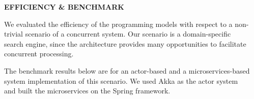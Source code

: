 \documentclass[final,hyperref={pdfpagelabels=true}]{beamer}
\begin{document}
\begin{frame}
\begin{columns}[t]
\begin{column}{.45\textwidth}
{      }
    \end{column}

    \begin{column}{.45\textwidth}
      \textsf{\textbf{EFFICIENCY \& BENCHMARK}} \\
      \vspace*{\baselineskip}
      {\lmodern
        We evaluated the efficiency of the programming models with respect to a non-trivial scenario of a concurrent system. Our scenario is a domain-specific search engine, since the architecture provides many opportunities to facilitate concurrent processing. 
        
        \vspace*{\baselineskip}
        
        The benchmark results below are for an actor-based and a microservices-based system implementation of this scenario. We used Akka as the actor system and built the microservices on the Spring framework.
      }

      \vspace*{\baselineskip}
      

\end{column}
\end{columns}
\end{frame}
\end{document}
